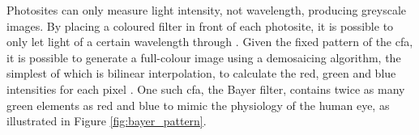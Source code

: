 Photosites can only measure light intensity, not wavelength, producing greyscale images. By placing a coloured filter in front of each photosite, it is possible to only let light of a certain wavelength through \cite{12_eastman_kodak_company_1976}. Given the fixed pattern of the \gls{cfa}, it is possible to generate a full-colour image using a demosaicing algorithm, the simplest of which is bilinear interpolation, to calculate the red, green and blue intensities for each pixel \cite{13_malvar_he_cutler_2015}. One such \gls{cfa}, the Bayer filter, contains twice as many green elements as red and blue to mimic the physiology of the human eye, as illustrated in Figure \ref{fig:bayer_pattern}.